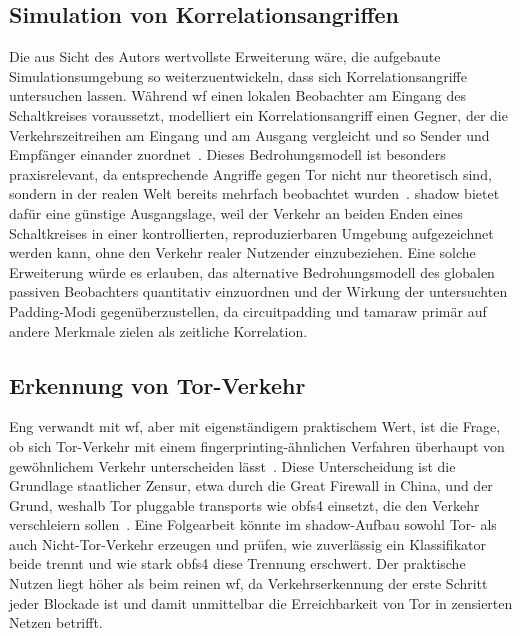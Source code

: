 \subsection{Simulation von Korrelationsangriffen}
\label{sec:ausblick_correlation}

Die aus Sicht des Autors wertvollste Erweiterung wäre, die aufgebaute Simulationsumgebung so weiterzuentwickeln, dass sich Korrelationsangriffe untersuchen lassen.
Während \gls{wf} einen lokalen Beobachter am Eingang des Schaltkreises voraussetzt, modelliert ein Korrelationsangriff einen Gegner, der die Verkehrszeitreihen am Eingang und am Ausgang vergleicht und so Sender und Empfänger einander zuordnet~\cite{murdoch2005low, nasr2018deepcorr}.
Dieses Bedrohungsmodell ist besonders praxisrelevant, da entsprechende Angriffe gegen Tor nicht nur theoretisch sind, sondern in der realen Welt bereits mehrfach beobachtet wurden~\cite{torproject2014advisory}.
\gls{shadow} bietet dafür eine günstige Ausgangslage, weil der Verkehr an beiden Enden eines Schaltkreises in einer kontrollierten, reproduzierbaren Umgebung aufgezeichnet werden kann, ohne den Verkehr realer Nutzender einzubeziehen.
Eine solche Erweiterung würde es erlauben, das alternative Bedrohungsmodell des globalen passiven Beobachters quantitativ einzuordnen und der Wirkung der untersuchten Padding-Modi gegenüberzustellen, da \gls{circuitpadding} und \gls{tamaraw} primär auf andere Merkmale zielen als zeitliche Korrelation.

\subsection{Erkennung von Tor-Verkehr}
\label{sec:ausblick_detection}

Eng verwandt mit \gls{wf}, aber mit eigenständigem praktischem Wert, ist die Frage, ob sich Tor-Verkehr mit einem fingerprinting-ähnlichen Verfahren überhaupt von gewöhnlichem Verkehr unterscheiden lässt~\cite{saputra2016detecting}.
Diese Unterscheidung ist die Grundlage staatlicher Zensur, etwa durch die Great Firewall in China, und der Grund, weshalb Tor pluggable transports wie obfs4 einsetzt, die den Verkehr verschleiern sollen~\cite{winter2012china}.
Eine Folgearbeit könnte im \gls{shadow}-Aufbau sowohl Tor- als auch Nicht-Tor-Verkehr erzeugen und prüfen, wie zuverlässig ein Klassifikator beide trennt und wie stark obfs4 diese Trennung erschwert.
Der praktische Nutzen liegt höher als beim reinen \gls{wf}, da Verkehrserkennung der erste Schritt jeder Blockade ist und damit unmittelbar die Erreichbarkeit von Tor in zensierten Netzen betrifft.

